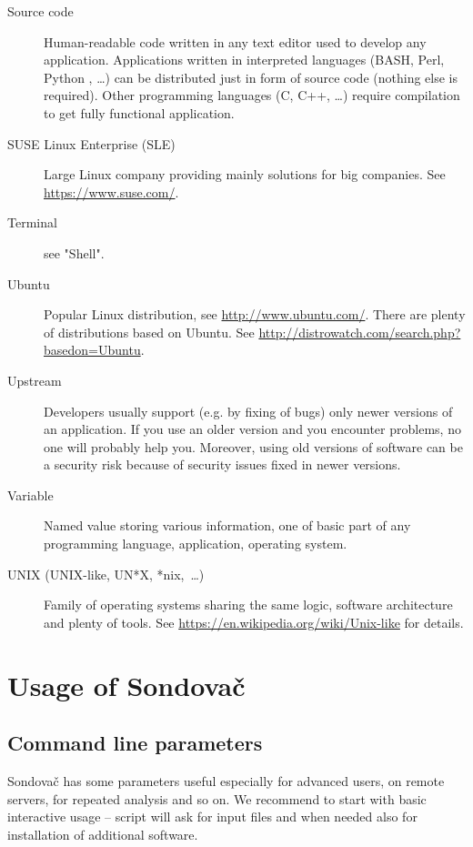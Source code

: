 \documentclass[a4paper, 11pt, twoside]{article}
\begin{document}
\begin{description}
  \item[Source code] Human-readable code written in any text editor used to develop any application. Applications written in interpreted languages (BASH, Perl, Python , \ldots) can be distributed just in form of source code (nothing else is required). Other programming languages (C, C++, \ldots) require compilation to get fully functional application.
  \item[SUSE Linux Enterprise (SLE)] Large Linux company providing mainly solutions for big companies. See \href{https://www.suse.com/}{https://www.suse.com/}.
  \item[Terminal] see "Shell".
  \item[Ubuntu] Popular Linux distribution, see \href{http://www.ubuntu.com/}{http://www.ubuntu.com/}. There are plenty of distributions based on Ubuntu. See \href{http://distrowatch.com/search.php?basedon=Ubuntu}{http://distrowatch.com/search.php?basedon=Ubuntu}.
  \item[Upstream] Developers usually support (e.g. by fixing of bugs) only newer versions of an application. If you use an older version and you encounter problems, no one will probably help you. Moreover, using old versions of software can be a security risk because of security issues fixed in newer versions.
  \item[Variable] Named value storing various information, one of basic part of any programming language, application, operating system.
  \item[UNIX (UNIX-like, UN*X, *nix,~\ldots)] Family of operating systems sharing the same logic, software architecture and plenty of tools. See \href{https://en.wikipedia.org/wiki/Unix-like}{https://en.wikipedia.org/wiki/Unix-like} for details.
\end{description}

\section{Usage of Sondovač}
\label{script-usage}

\subsection{Command line parameters}

Sondovač has some parameters useful especially for advanced users, on remote servers, for repeated analysis and so on. We recommend to start with basic interactive usage -- script will ask for input files and when needed also for installation of additional software.
\end{document}
